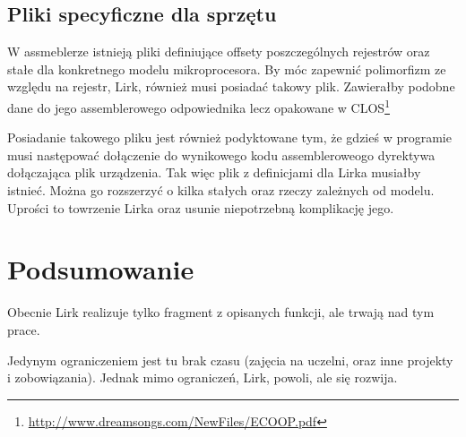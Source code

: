 \documentclass[11pt]{article}
\begin{document}
\subsection{Pliki specyficzne dla sprzętu}
W assmeblerze istnieją pliki definiujące offsety poszczególnych rejestrów oraz stałe dla konkretnego modelu mikroprocesora.
By móc zapewnić polimorfizm ze względu na rejestr, Lirk, również musi posiadać takowy plik.
Zawierałby podobne dane do jego assemblerowego odpowiednika lecz opakowane w CLOS\footnote{\url{http://www.dreamsongs.com/NewFiles/ECOOP.pdf}}
 
Posiadanie takowego pliku jest również podyktowane tym, że gdzieś w programie musi następować
dołączenie do wynikowego kodu assembleroweogo dyrektywa dołączająca plik urządzenia.
Tak więc plik z definicjami dla Lirka musiałby istnieć. Można go rozszerzyć o kilka stałych oraz rzeczy zależnych od modelu.
Uprości to towrzenie Lirka oraz usunie niepotrzebną komplikację jego.

\section{Podsumowanie}
Obecnie Lirk realizuje tylko fragment z opisanych funkcji, ale trwają nad tym prace. 

Jedynym ograniczeniem jest tu brak czasu (zajęcia na uczelni, oraz inne projekty i zobowiązania). Jednak mimo ograniczeń, Lirk, powoli, ale się rozwija.
\end{document}
